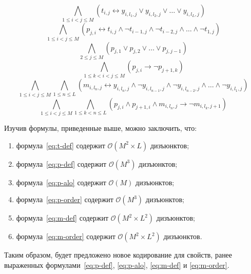 \begin{equation}
\label{eq:t-def}
  \bigwedge_{1 \leq i < j \leq M} \left(t_{i,j} \leftrightarrow y_{i,l_{1},j} \vee y_{i,l_{2},j} \vee \ldots \vee y_{i,l_{L},j} \right)
\end{equation}
%
\begin{equation}
\label{eq:p-def}
  \bigwedge_{1 \leq i < j \leq M} \left(p_{j,i} \leftrightarrow t_{i,j} \wedge \neg t_{i - 1,j} \wedge \neg t_{i - 2, j} \wedge \ldots \wedge \neg t_{1,j}\right)
\end{equation}
%
\begin{equation}
\label{eq:p-alo}
  \bigwedge_{2 \leq j \leq M} \left(p_{j,1} \vee p_{j,2} \vee \ldots \vee p_{j,j - 1}\right)
\end{equation}
%
\begin{equation}
\label{eq:p-order}
  \bigwedge_{1 \leq k < i < j \leq M} \left(p_{j,i} \rightarrow \neg p_{j + 1, k}\right)
\end{equation}
%
\begin{equation}
\label{eq:m-def}
  \bigwedge_{1 \leq i < j \leq M} \bigwedge_{1 \leq n \leq L} \left(m_{i,l_{n},j} \leftrightarrow y_{i,l_{n},j} \wedge \neg y_{i,l_{n - 1}, j} \wedge \neg y_{i,l_{n - 2}, j} \wedge \ldots \wedge \neg y_{i,l_{1},j} \right)
\end{equation}
%
\begin{equation}
\label{eq:m-order}
  \bigwedge_{1 \leq i < j \leq M} \bigwedge_{1 \leq k < n \leq L} \left(p_{j,i} \wedge p_{j + 1, i} \wedge m_{i,l_{n}, j} \rightarrow \neg m_{i, l_{k}, j + 1}\right)
\end{equation}

Изучив формулы, приведенные выше, можно заключить, что:
\begin{enumerate}
  \item формула~\eqref{eq:t-def} содержит $\mathcal{O}\left(M^{2} \times L\right)$ дизъюнктов;
  \item формула~\eqref{eq:p-def} содержит $\mathcal{O}\left(M^{3}\right)$ дизъюнктов;
  \item формула~\eqref{eq:p-alo} содержит $\mathcal{O}\left(M\right)$ дизъюнктов;
  \item формула~\eqref{eq:p-order} содержит $\mathcal{O}\left(M^{3}\right)$ дизъюнктов;
  \item формула~\eqref{eq:m-def} содержит $\mathcal{O}\left(M^{2} \times L^{2}\right)$ дизъюнктов;
  \item формула~\eqref{eq:m-order} содержит $\mathcal{O}\left(M^{2} \times L^{2}\right)$ дизъюнктов.
\end{enumerate}
%
Таким образом, будет предложено новое кодирование для свойств, ранее выраженных формулами~\eqref{eq:p-def}, \eqref{eq:p-alo}, \eqref{eq:m-def} и \eqref{eq:m-order}.

